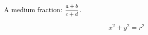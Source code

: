 \documentclass{article}
\begin{document}
A medium fraction: $\medmath{\frac{a+b}{c+d}}$.\\
\begin{fleqn}[2em]
\[ x^2 + y^2 = r^2 \]
\end{fleqn}
\end{document}
